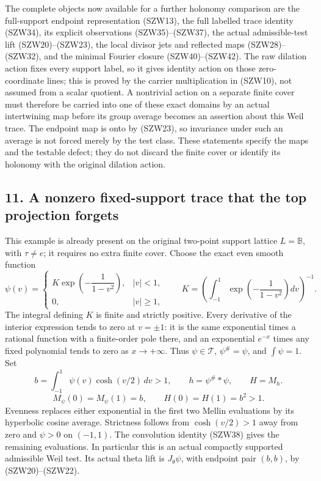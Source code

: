 \documentclass[
  10pt,
  a4paper,
]{article}
\begin{document}
The complete objects now available for a further holonomy comparison are
the full-support endpoint representation (SZW13), the full labelled
trace identity (SZW34), its explicit observations (SZW35)--(SZW37), the
actual admissible-test lift (SZW20)--(SZW23), the local divisor jets and
reflected maps (SZW28)--(SZW32), and the minimal Fourier closure
(SZW40)--(SZW42). The raw dilation action fixes every support label, so
it gives identity action on those zero-coordinate lines; this is proved
by the carrier multiplication in (SZW10), not assumed from a scalar
quotient. A nontrivial action on a separate finite cover must therefore
be carried into one of these exact domains by an actual intertwining map
before its group average becomes an assertion about this Weil trace. The
endpoint map is onto by (SZW23), so invariance under such an average is
not forced merely by the test class. These statements specify the maps
and the testable defect; they do not discard the finite cover or
identify its holonomy with the original dilation action.

\subsection{11. A nonzero fixed-support trace that the top projection
forgets}\label{a-nonzero-fixed-support-trace-that-the-top-projection-forgets}

This example is already present on the original two-point support
lattice \(L=\mathbb B\), with \(\tau\ne e\); it requires no extra finite
cover. Choose the exact even smooth function \[
\psi(v)=
\begin{cases}
K\exp\!\left(-\dfrac1{1-v^2}\right),& |v|<1,\\
0,& |v|\ge1,
\end{cases}
\qquad
K=\left(\int_{-1}^1\exp\!\left(-\dfrac1{1-v^2}\right)dv\right)^{-1}.
\tag{SZW44}
\] The integral defining \(K\) is finite and strictly positive. Every
derivative of the interior expression tends to zero at \(v=\pm1\): it is
the same exponential times a rational function with a finite-order pole
there, and an exponential \(e^{-x}\) times any fixed polynomial tends to
zero as \(x\to+\infty\). Thus \(\psi\in\mathcal T\), \(\psi^\#=\psi\),
and \(\int\psi=1\). Set \[
b=\int_{-1}^1\psi(v)\cosh(v/2)\,dv>1,
\qquad h=\psi^\#*\psi,\qquad H=M_h.
\] \[
M_\psi(0)=M_\psi(1)=b,
\qquad H(0)=H(1)=b^2>1.
\tag{SZW45}
\] Evenness replaces either exponential in the first two Mellin
evaluations by its hyperbolic cosine average. Strictness follows from
\(\cosh(v/2)>1\) away from zero and \(\psi>0\) on \((-1,1)\). The
convolution identity (SZW38) gives the remaining evaluations. In
particular this is an actual compactly supported admissible Weil test.
Its actual theta lift is \(J_\theta\psi\), with endpoint pair \((b,b)\),
by (SZW20)--(SZW22).
\end{document}
